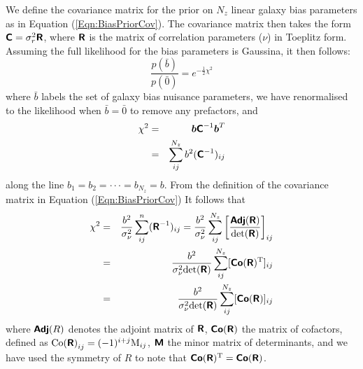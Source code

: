 \documentclass[useAMS,usenatbib,times,letter,amssymb]{mn2e}
\def\be{\begin{equation}}
\def\ee{\end{equation}}
\def\bea{\begin{eqnarray}}
\def\eea{\end{eqnarray}}
\newcommand{\bm}[1]{\mbox{\boldmath{$#1$}}}   %
\begin{document}
We define the covariance matrix for the prior on $N_z$ linear galaxy bias parameters as in Equation (\ref{Eqn:BiasPriorCov}). The covariance matrix then takes the form $\textbf{\textsf{C}} = \sigma_r^2 \textbf{\textsf{R}}$, where $\textbf{\textsf{R}}$ is the matrix of correlation parameters ($\nu$) in Toeplitz form. Assuming the full likelihood for the bias parameters is Gaussina, it then follows:
\be
\frac{p(\bar{b})}{p(\bar{0})}  =  e^{-\frac{1}{2}\chi^2}
\ee
 where $\bar{b}$ labels the set of galaxy bias nuisance parameters, we have renormalised to the likelihood when $\bar{b} = \bar{0}$ to remove any prefactors, and
 \bea
 \chi^2 & = &\bm{b}\mathbfss{C}^{-1}\bm{b}^T\nonumber\\
 &=& \sum_{ij} ^{N_z} b^2 (\mathbfss{C}^{-1})_{ij}
 \eea
 along the line $b_1 = b_2 = \cdot\cdot\cdot = b_{N_z} = b$. From the definition of the covariance matrix in Equation (\ref{Eqn:BiasPriorCov}) It follows that
  \begin{eqnarray}
   \chi^2 &=& \frac{b^2}{\sigma_\nu^2}\sum_{ij}^n (\textbf{\textsf{R}}^{-1})_{ij} = \frac{b^2}{\sigma_\nu^2}\sum_{ij}^{N_z} \left[\frac{\textbf{\textsf{Adj}}(\textbf{\textsf{R}})}{{\rm det}(\textbf{\textsf{R}})}\right]_{ij} \nonumber\\ &=& \frac{b^2}{\sigma_\nu^2 {\rm det}(\textbf{\textsf{R}})}\sum_{ij}^{N_z} [\textbf{\textsf{Co}}(\textbf{\textsf{R}})^{\rm T}]_{ij}\nonumber\\
 &=&  \frac{b^2}{\sigma_\nu^2 {\rm det}(\textbf{\textsf{R}})}\sum_{ij}^{N_z} [ \textbf{\textsf{Co}}(\textbf{\textsf{R}})]_{ij} \label{eqn:nChi}
 \end{eqnarray}
 where $\textbf{\textsf{Adj}}(R)$ denotes the adjoint matrix of $\textbf{\textsf{R}}$, $\textbf{\textsf{Co}}(\textbf{\textsf{R}})$ the matrix of cofactors, defined as $ {\rm Co(\textbf{\textsf{R}})}_{ij} = (-1)^{i+j}{\rm M}_{ij}$, $\textbf{\textsf{M}}$ the minor matrix of determinants, and we have used the symmetry of $R$ to note that $\textbf{\textsf{Co}}(\textbf{\textsf{R}})^{\rm T} = \textbf{\textsf{Co}}(\textbf{\textsf{R}})$. 
  
\end{document}
